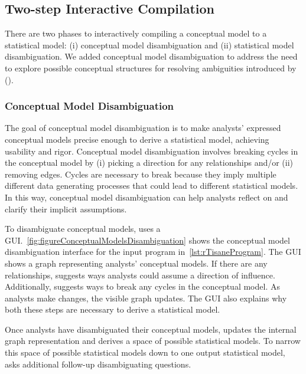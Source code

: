 \subsection{Two-step Interactive Compilation}
There are two phases to interactively compiling a conceptual model to a
statistical model: (i) conceptual model disambiguation and (ii) statistical
model disambiguation. We added conceptual model disambiguation to address the
need to explore possible conceptual structures for resolving ambiguities
introduced by \relates (\considerPossibilities).

\conceptualModelDisambiguation
\subsubsection{Conceptual Model Disambiguation} \label{subsec:conceptualModelDisambig} 
The goal of conceptual model disambiguation is to make analysts' expressed
conceptual models precise enough to derive a statistical model, achieving
usability and rigor. Conceptual model disambiguation involves breaking cycles in
the conceptual model by (i) picking a direction for any \relates relationships
and/or (ii) removing edges. Cycles are necessary to break because they imply
multiple different data generating processes that could lead to different
statistical models. In this way, conceptual model disambiguation can help analysts
reflect on and clarify their implicit assumptions. 

To disambiguate conceptual models, \rTisane uses a GUI.~\autoref{fig:figureConceptualModelsDisambiguation} shows the conceptual model disambiguation interface for the input program in~\autoref{lst:rTisaneProgram}. The GUI shows a graph
representing analysts' conceptual models. If there are any \relates
relationships, \rTisane suggests ways analysts could assume a direction of
influence. Additionally, \rTisane suggests ways to break any cycles in the
conceptual model. As analysts make changes, the visible graph updates. The GUI
also explains why both these steps are necessary to derive a statistical model. 

Once analysts have disambiguated their conceptual models, \rTisane updates the
internal graph representation and derives a space of possible statistical
models. To narrow this space of possible statistical models down to one output
statistical model, \rTisane asks additional follow-up disambiguating questions. 

\begin{comment}
This problem is actually challenging because detecting all cycles in a graph is
an NP-hard problem. We adapt a version of Johnson's(?) algorithm.
\end{comment}


